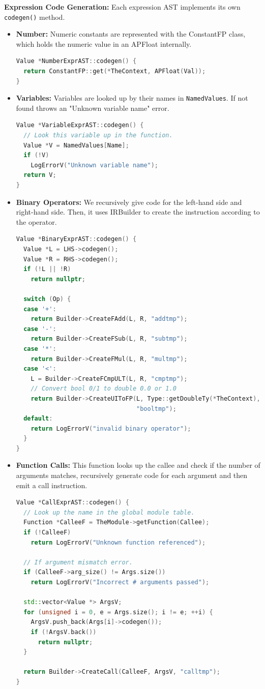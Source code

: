 \documentclass[acmlarge, nonacm]{acmart}
\begin{document}
\textbf{Expression Code Generation:} Each expression AST implements its own \verb|codegen()| method.
\begin{itemize}
\item{\textbf{Number:}} Numeric constants are represented with the ConstantFP class, which holds the numeric value in an APFloat internally.
\begin{lstlisting}[language=C++]
Value *NumberExprAST::codegen() {
  return ConstantFP::get(*TheContext, APFloat(Val));
}
\end{lstlisting}

\item{\textbf{Variables:}} Variables are looked up by their names in \verb|NamedValues|. If not found throws an "Unknown variable name" error.
\begin{lstlisting}[language=C++]
Value *VariableExprAST::codegen() {
  // Look this variable up in the function.
  Value *V = NamedValues[Name];
  if (!V)
    LogErrorV("Unknown variable name");
  return V;
}
\end{lstlisting}

\item{\textbf{Binary Operators:}} We recursively give code for the left-hand side and right-hand side. Then, it uses IRBuilder to create the instruction according to the operator.
\begin{lstlisting}[language=C++]
Value *BinaryExprAST::codegen() {
  Value *L = LHS->codegen();
  Value *R = RHS->codegen();
  if (!L || !R)
    return nullptr;

  switch (Op) {
  case '+':
    return Builder->CreateFAdd(L, R, "addtmp");
  case '-':
    return Builder->CreateFSub(L, R, "subtmp");
  case '*':
    return Builder->CreateFMul(L, R, "multmp");
  case '<':
    L = Builder->CreateFCmpULT(L, R, "cmptmp");
    // Convert bool 0/1 to double 0.0 or 1.0
    return Builder->CreateUIToFP(L, Type::getDoubleTy(*TheContext),
                                 "booltmp");
  default:
    return LogErrorV("invalid binary operator");
  }
}
\end{lstlisting}

\item{\textbf{Function Calls:}} This function looks up the callee and check if the number of arguments matches, recursively generate code for each argument and then emit a call instruction.
\begin{lstlisting}[language=C++]
Value *CallExprAST::codegen() {
  // Look up the name in the global module table.
  Function *CalleeF = TheModule->getFunction(Callee);
  if (!CalleeF)
    return LogErrorV("Unknown function referenced");

  // If argument mismatch error.
  if (CalleeF->arg_size() != Args.size())
    return LogErrorV("Incorrect # arguments passed");

  std::vector<Value *> ArgsV;
  for (unsigned i = 0, e = Args.size(); i != e; ++i) {
    ArgsV.push_back(Args[i]->codegen());
    if (!ArgsV.back())
      return nullptr;
  }

  return Builder->CreateCall(CalleeF, ArgsV, "calltmp");
}
\end{lstlisting}
\end{itemize}
\end{document}
